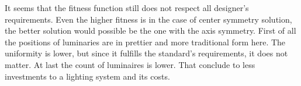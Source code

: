 It seems that the fitness function still does not respect all designer's requirements. Even the higher fitness is in the case of center symmetry solution, the better solution would possible be the one with the axis symmetry. First of all the positions of luminaries are in prettier and more traditional form here. The uniformity is lower, but since it fulfills the standard's requirements, it does not matter. At last the count of luminaires is lower. That conclude to less investments to a lighting system and its costs.

